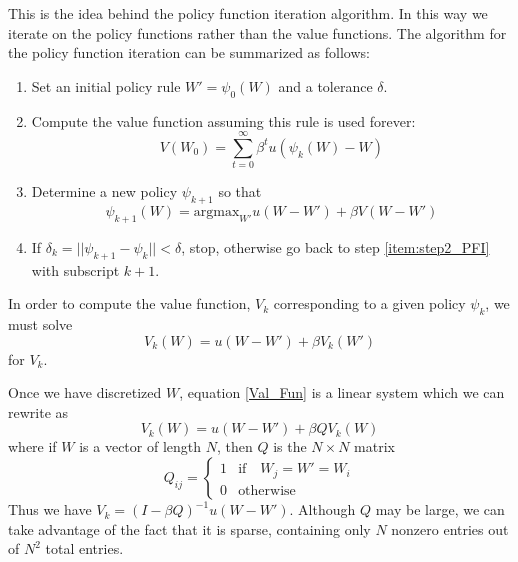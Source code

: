 This is the idea behind the policy function iteration algorithm.  In this way we iterate on the policy functions rather than the value functions.  The algorithm for the policy function iteration can be summarized as follows:
\begin{enumerate}
\item Set an initial policy rule $W' = \psi_0(W)$ and a tolerance $\delta$.

\item \label{item:step2_PFI} Compute the value function assuming this rule is used forever:
\begin{equation*}
V(W_0) = \sum_{t=0}^\infty \beta^t u(\psi_k(W)-W)
\end{equation*}

\item Determine a new policy $\psi_{k+1}$ so that
\begin{equation*}
\psi_{k+1}(W) = \text{argmax}_{W'} u(W-W') + \beta V(W-W')
\end{equation*}

\item If $\delta_k = ||\psi_{k+1} - \psi_k|| < \delta$, stop, otherwise go back to step \ref{item:step2_PFI} with subscript $k+1$.
\end{enumerate}
In order to compute the value function, $V_k$ corresponding to a given policy $\psi_k$, we must solve
\begin{equation}
\label{Val_Fun}
V_k(W) = u(W-W') + \beta V_k(W')
\end{equation}
for $V_k$.

Once we have discretized $W$, equation \eqref{Val_Fun} is a linear system which we can rewrite as
\begin{equation*}
V_k(W) = u(W-W') + \beta QV_k(W)
\end{equation*}
where if $W$ is a vector of length $N$, then $Q$ is the $N\times N$ matrix
\begin{equation*}
Q_{ij} = \left\{
     \begin{array}{ll}
       1 & \text{if} \quad  W_j = W' = W_i\\
       0 & \text{otherwise}
     \end{array}
   \right.
\end{equation*}
Thus we have $V_k = (I-\beta Q)^{-1}u(W-W')$.  Although $Q$ may be large, we can take advantage of the fact that it is sparse, containing only $N$ nonzero entries out of $N^2$ total entries.

